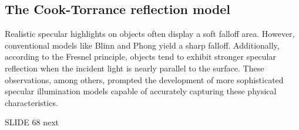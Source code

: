 \subsection{The Cook-Torrance reflection model}
Realistic specular highlights on objects often display a soft falloff area. However, conventional models like Blinn and Phong yield a sharp falloff. 
Additionally, according to the Fresnel principle, objects tend to exhibit stronger specular reflection when the incident light is nearly parallel to the surface. 
These observations, among others, prompted the development of more sophisticated specular illumination models capable of accurately capturing these physical characteristics.

SLIDE 68 next
